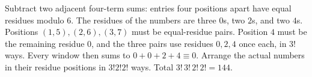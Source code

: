 Subtract two adjacent four-term sums: entries four positions apart have equal residues modulo $6$. The residues of the numbers are three $0$s, two $2$s, and two $4$s. Positions $(1,5),(2,6),(3,7)$ must be equal-residue pairs. Position $4$ must be the remaining residue $0$, and the three pairs use residues $0,2,4$ once each, in $3!$ ways. Every window then sums to $0+0+2+4\equiv0$. Arrange the actual numbers in their residue positions in $3!2!2!$ ways. Total $\boxed{3!\,3!\,2!\,2!=144}$.
